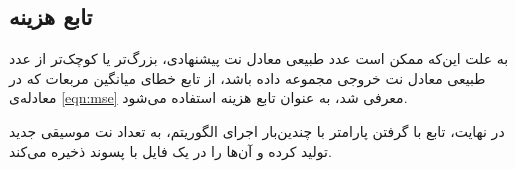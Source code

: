 
\subsection{تابع هزینه}
به علت این‌که ممکن است عدد طبیعی معادل نت پیشنهادی، بزرگ‌تر یا کوچک‌تر از عدد طبیعی معادل نت خروجی مجموعه داده باشد، از تابع خطای میانگین مربعات که در معادله‌ی
\ref{eqn:mse}
معرفی شد، به عنوان تابع هزینه استفاده می‌شود.

در نهایت، تابع
با گرفتن پارامتر
با چندین‌بار اجرای الگوریتم، به تعداد
نت موسیقی جدید تولید کرده و آن‌ها را در یک فایل با پسوند
ذخیره می‌کند.

